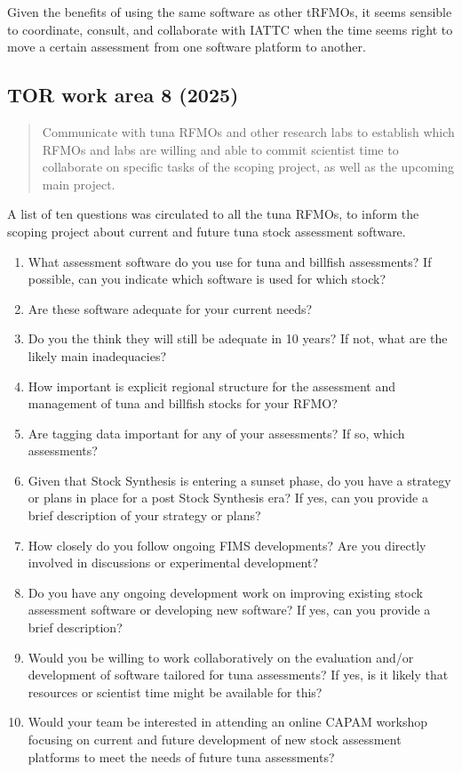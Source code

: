 \documentclass{SCreport}
\begin{document}
Given the benefits of using the same software as other tRFMOs, it seems sensible
to coordinate, consult, and collaborate with IATTC when the time seems right to
move a certain assessment from one software platform to another.

\vspace{2ex}

\hypertarget{link:tor-8}{}
\subsection{TOR work area 8 (2025)}
\label{sec:tor-8}

\begin{quote}\sf
  Communicate with tuna RFMOs and other research labs to establish which RFMOs
  and labs are willing and able to commit scientist time to collaborate on
  specific tasks of the scoping project, as well as the upcoming main project.
\end{quote}

\vspace{2ex}

A list of ten questions was circulated to all the tuna RFMOs, to inform the
scoping project about current and future tuna stock assessment software.

\begin{enumerate}
  \item What assessment software do you use for tuna and billfish assessments?
  If possible, can you indicate which software is used for which stock?
  \item Are these software adequate for your current needs?
  \item Do you the think they will still be adequate in 10 years? If not, what
  are the likely main inadequacies?
  \item How important is explicit regional structure for the assessment and
  management of tuna and billfish stocks for your RFMO?
  \item Are tagging data important for any of your assessments? If so, which
  assessments?
  \item Given that Stock Synthesis is entering a sunset phase, do you have a
  strategy or plans in place for a post Stock Synthesis era? If yes, can you
  provide a brief description of your strategy or plans?
  \item How closely do you follow ongoing FIMS developments? Are you directly
  involved in discussions or experimental development?
  \item Do you have any ongoing development work on improving existing stock
  assessment software or developing new software? If yes, can you provide a
  brief description?
  \item Would you be willing to work collaboratively on the evaluation and/or
  development of software tailored for tuna assessments? If yes, is it likely
  that resources or scientist time might be available for this?
  \item Would your team be interested in attending an online CAPAM workshop
  focusing on current and future development of new stock assessment platforms
  to meet the needs of future tuna assessments?
\end{enumerate}
\end{document}
